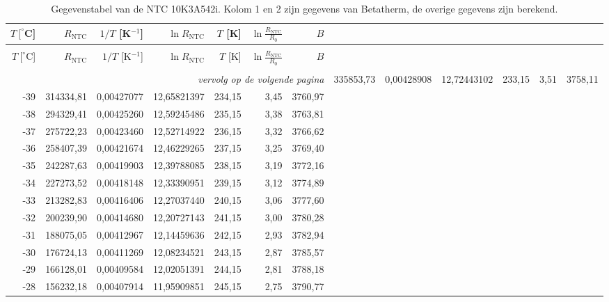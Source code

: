 \documentclass[12pt,a4paper,final,twoside,fleqn]{article}
\newcommand{\rntc}{R_\text{NTC}}
\newcommand{\ntctype}{10K3A542i}
\newcommand{\ntcman}{Betatherm}
\begin{document}
\begin{ThreePartTable}
\begin{longtable}{rrrrrrr}
\caption{Gegevenstabel van de NTC \ntctype. Kolom 1 en 2 zijn gegevens van \ntcman, de
overige gegevens zijn berekend.}\label{tab:specsntc} \\
$T\ [^\circ$C] & $\rntc$ & $1/T$ [K$^{-1}$]     & $\ln \rntc$ & $T$ [K] & $\ln\frac{\rntc}{R_0}$ & $B$\tnote{a} \\[0.3ex]
\hline \\[-2.0ex]
\endfirsthead
$T\ [^\circ$C] & $\rntc$ & $1/T$ [K$^{-1}$]     & $\ln \rntc$ & $T$ [K] & $\ln\frac{\rntc}{R_0}$ & $B$\tnote{a} \\[0.3ex]
\hline \\[-2.0ex]
\endhead
\hline \multicolumn{7}{r}{\small\sl{vervolg op de volgende pagina}}
\endfoot
\hline
\endlastfoot
-40          & 335853,73 & 0,00428908    & 12,72443102 & 233,15     & 3,51       & 3758,11 \\
-39          & 314334,81 & 0,00427077    & 12,65821397 & 234,15     & 3,45       & 3760,97 \\
-38          & 294329,41 & 0,00425260    & 12,59245486 & 235,15     & 3,38       & 3763,81 \\
-37          & 275722,23 & 0,00423460    & 12,52714922 & 236,15     & 3,32       & 3766,62 \\
-36          & 258407,39 & 0,00421674    & 12,46229265 & 237,15     & 3,25       & 3769,40 \\
-35          & 242287,63 & 0,00419903    & 12,39788085 & 238,15     & 3,19       & 3772,16 \\
-34          & 227273,52 & 0,00418148    & 12,33390951 & 239,15     & 3,12       & 3774,89 \\
-33          & 213282,83 & 0,00416406    & 12,27037440 & 240,15     & 3,06       & 3777,60 \\
-32          & 200239,90 & 0,00414680    & 12,20727143 & 241,15     & 3,00       & 3780,28 \\
-31          & 188075,05 & 0,00412967    & 12,14459636 & 242,15     & 2,93       & 3782,94 \\
-30          & 176724,13 & 0,00411269    & 12,08234521 & 243,15     & 2,87       & 3785,57 \\
-29          & 166128,01 & 0,00409584    & 12,02051391 & 244,15     & 2,81       & 3788,18 \\
-28          & 156232,18 & 0,00407914    & 11,95909851 & 245,15     & 2,75       & 3790,77 \\

\end{longtable}
\end{ThreePartTable}
\end{document}
